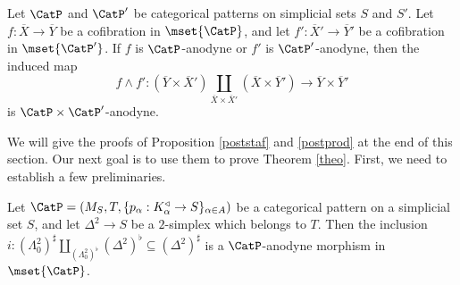 \begin{proposition}\label{postprod}
Let $\CatP$ and $\CatP'$ be categorical patterns on simplicial sets $S$ and $S'$. Let
$f: \overline{X} \rightarrow \overline{Y}$ be a cofibration in $\mset{\CatP}$, and let
$f': \overline{X}' \rightarrow \overline{Y}'$ be a cofibration in $\mset{\CatP'}$.
If $f$ is $\CatP$-anodyne or $f'$ is $\CatP'$-anodyne, then the induced map
$$ f \wedge f': ( \overline{Y} \times \overline{X}' ) \coprod_{ \overline{X} \times \overline{X}' }
( \overline{X} \times \overline{Y}' ) \rightarrow \overline{Y} \times \overline{Y}'$$
is $\CatP \times \CatP'$-anodyne.
\end{proposition}

We will give the proofs of Proposition \ref{poststaf} and \ref{postprod} at the end of this section.
Our next goal is to use them to prove Theorem \ref{theo}. First, we need to establish a few preliminaries.

\begin{lemma}\label{catchrat}
Let $\CatP = (M_S, T, \{ p_{\alpha}: K_{\alpha}^{\triangleleft} \rightarrow S\}_{\alpha \in A})$
be a categorical pattern on a simplicial set $S$, and let $\Delta^2 \rightarrow S$ be a $2$-simplex which belongs to $T$. Then the inclusion
$i: ( \Lambda^2_0)^{\sharp} \coprod_{ (\Lambda^2_{0})^{\flat}} (\Delta^2)^{\flat}  \subseteq (\Delta^2)^{\sharp}$ is a $\CatP$-anodyne morphism in $\mset{ \CatP}$.
\end{lemma}

